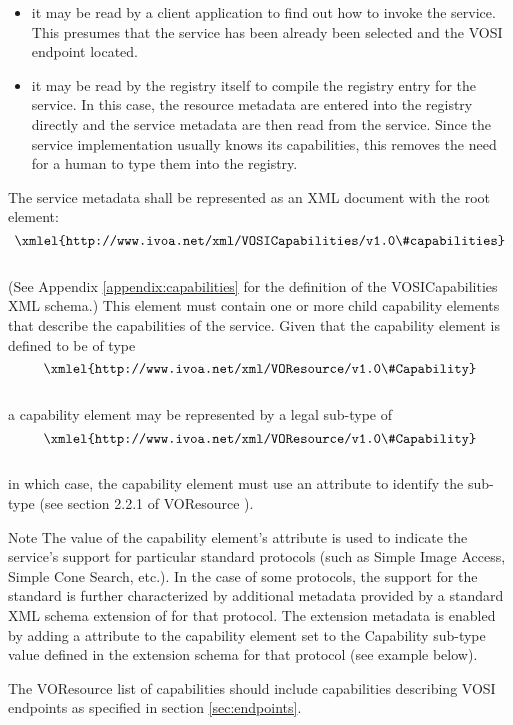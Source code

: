 \documentclass[11pt,letter]{ivoa}
\begin{document}
\begin{itemize}
\item it may be read by a client application to find out how to invoke
the service. This presumes that the service has been already been
selected and the VOSI endpoint located.
\item it may be read by the registry itself to compile the registry
entry for the service. In this case, the resource metadata are entered
into the registry directly and the service metadata are then read from
the service. Since the service implementation usually knows its
capabilities, this removes the need for a human to type them into the
registry. 
\end{itemize}

The service metadata shall be represented as an XML document with the root element:\\
$$\hbox{\xmlel{http://www.ivoa.net/xml/VOSICapabilities/v1.0\#capabilities}}$$\\
(See Appendix \ref{appendix:capabilities} for the definition of the
VOSICapabilities XML schema.) This element must contain one or more
child capability elements that describe the capabilities of the service.
Given that the capability element is defined to be of type\\
$$\hbox{\xmlel{http://www.ivoa.net/xml/VOResource/v1.0\#Capability}}$$\\
a capability element may be represented by a legal sub-type of\\
$$\hbox{\xmlel{http://www.ivoa.net/xml/VOResource/v1.0\#Capability}}$$\\
in which case, the capability element must use an 
attribute to identify the sub-type (see section 2.2.1 of VOResource
\citep{2018ivoa.spec.0625P}). 

\begin{admonition}{Note}
The value of the capability element's  attribute is
used to indicate the service's support for particular standard protocols
(such as Simple Image Access, Simple Cone Search, etc.). In the case of
some protocols, the support for the standard is further characterized by
additional metadata provided by a standard XML schema extension of
 for that protocol. The extension metadata is enabled
by adding a  attribute to the capability element set to
the Capability sub-type value defined in the extension schema for that
protocol (see example below). 
    
The VOResource list of capabilities should include capabilities
describing VOSI endpoints as specified in section \ref{sec:endpoints}.
\end{admonition}
\end{document}
